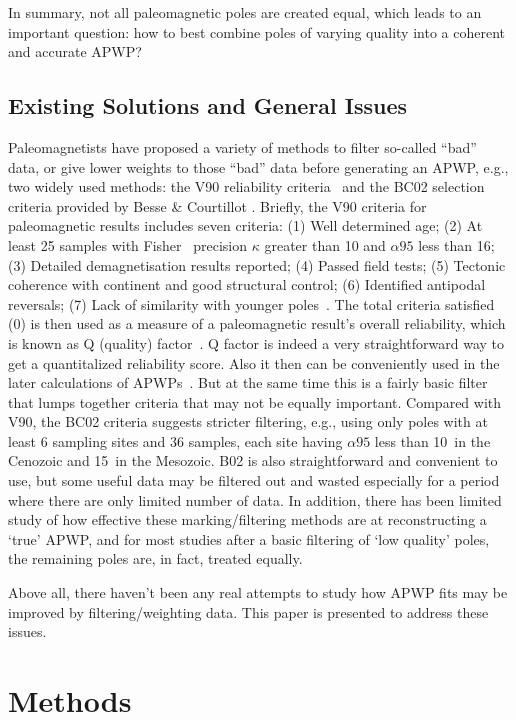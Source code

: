 In summary, not all paleomagnetic poles are created equal, which leads to an
important question: how to best combine poles of varying quality into a coherent
and accurate APWP\@?

\subsection{Existing Solutions and General Issues}

Paleomagnetists have proposed a variety of methods to filter so-called ``bad''
data, or give lower weights to those ``bad'' data before generating an APWP,
e.g., two widely used methods: the V90 reliability criteria~\cite{v90} and the
BC02 selection criteria provided by Besse \& Courtillot .
Briefly, the V90 criteria for paleomagnetic results includes seven criteria: (1)
Well determined age; (2) At least 25 samples with Fisher~\cite{F53} precision
$\kappa$ greater than 10 and $\alpha95$ less than 16\degree; (3) Detailed
demagnetisation results reported; (4) Passed field tests; (5) Tectonic coherence
with continent and good structural control; (6) Identified antipodal reversals;
(7) Lack of similarity with younger poles~\cite{T92}. The total criteria
satisfied (0) is then used as a measure of a paleomagnetic result's
overall reliability, which is known as Q (quality) factor~\cite{T92}. Q factor
is indeed a very straightforward way to get a quantitalized reliability score.
Also it then can be conveniently used in the later calculations of
APWPs~\cite{T92}. But at the same time this is a fairly basic filter that lumps
together criteria that may not be equally important. Compared with V90, the BC02
criteria suggests stricter filtering, e.g., using only poles with at least 6
sampling sites and 36 samples, each site having $\alpha95$ less than 10\degree\
in the Cenozoic and 15\degree\ in the Mesozoic. B02 is also straightforward and
convenient to use, but some useful data may be filtered out and wasted
especially for a period where there are only limited number of data. In
addition, there has been limited study of how effective these marking/filtering
methods are at reconstructing a `true' APWP, and for most studies after a basic
filtering of `low quality' poles, the remaining poles are, in fact, treated
equally.

Above all, there haven't been any real attempts to study how APWP fits may be
improved by filtering/weighting data. This paper is presented to address these
issues.


\section{Methods}

